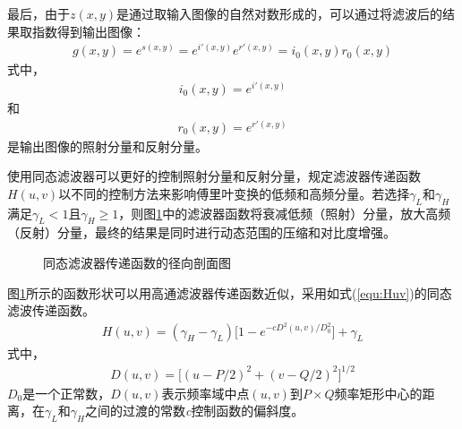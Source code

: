 \documentclass{hitreport}
\begin{document}
最后，由于$z\left(x,y\right)$是通过取输入图像的自然对数形成的，可以通过将滤波后的结果取指数得到输出图像：
\begin{align}
g\left(x,y\right) = e^{s\left(x,y\right)} = e^{i'\left(x,y\right)}e^{r'\left(x,y\right)} = i_0\left(x,y\right)r_0\left(x,y\right)
\end{align}
式中，
\begin{align}
i_0\left(x,y\right) = e^{i'\left(x,y\right)}
\end{align}
和
\begin{align}
r_0\left(x,y\right) = e^{r'\left(x,y\right)}
\end{align}
是输出图像的照射分量和反射分量。

使用同态滤波器可以更好的控制照射分量和反射分量，规定滤波器传递函数$H\left(u,v\right)$以不同的控制方法来影响傅里叶变换的低频和高频分量。若选择$\gamma_L$和$\gamma_H$满足$\gamma_L<1$且$\gamma_H\ge 1$，则图\ref{fig:F}中的滤波器函数将衰减低频（照射）分量，放大高频（反射）分量，最终的结果是同时进行动态范围的压缩和对比度增强。

\begin{figure}[H]
\centering
{}
\caption{同态滤波器传递函数的径向剖面图}\label{fig:F}
\end{figure}


图\ref{fig:F}所示的函数形状可以用高通滤波器传递函数近似，采用如式(\ref{equ:Huv})的同态滤波传递函数。
\begin{align}\label{equ:Huv}
H\left(u,v\right) = \left(\gamma_H-\gamma_L\right)\Big[1-e^{\left. -cD^2\left(u,v\right)/D_0^2 \right.}\Big] + \gamma_L
\end{align}
式中，
\begin{align}
D\left(u,v\right) = \Big[\left(u-\left.P/2\right.\right)^2 + \left(v-\left.Q/2\right.\right)^2\Big]^{\left.1/2\right.}
\end{align}
$D_0$是一个正常数，$D\left(u,v\right)$表示频率域中点$\left(u,v\right)$到$P\times Q$频率矩形中心的距离，在$\gamma_L$和$\gamma_H$之间的过渡的常数\textit{c}控制函数的偏斜度。
\end{document}
